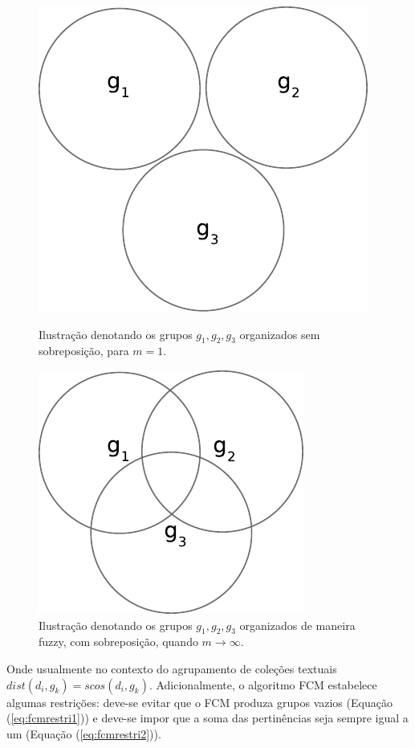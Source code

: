 \begin{figure}[!htp] \centering 
   \begin{minipage}{0.45\textwidth} 
     \centering
    \includegraphics[width=0.6\columnwidth]{assets/clusters_crisp.pdf} 
    \caption{Ilustração denotando os
grupos $g_1,g_2,g_3$ organizados sem sobreposição, para $m = 1$.} \label{fig:cluster_crisp}
  \end{minipage}\hfill 
  \begin{minipage}{0.45\textwidth} \centering
    \includegraphics[width=0.6\columnwidth]{assets/clusters_fuzzy.pdf} 
    \caption{Ilustração denotando os
     grupos $g_1,g_2,g_3$ organizados de maneira fuzzy, com sobreposição, quando 
     $m \rightarrow \infty$.}
     \label{fig:cluster_fuzzy} 
   \end{minipage} 
\end{figure}

Onde usualmente no contexto do agrupamento de coleções textuais $dist(d_i,g_k) = scos(d_i,g_k)$.
Adicionalmente, o algoritmo FCM estabelece algumas restrições: deve-se evitar que o FCM produza
grupos vazios (Equação (\ref{eq:fcmrestri1})) e deve-se impor que a soma das pertinências seja
sempre igual a um (Equação (\ref{eq:fcmrestri2})).

